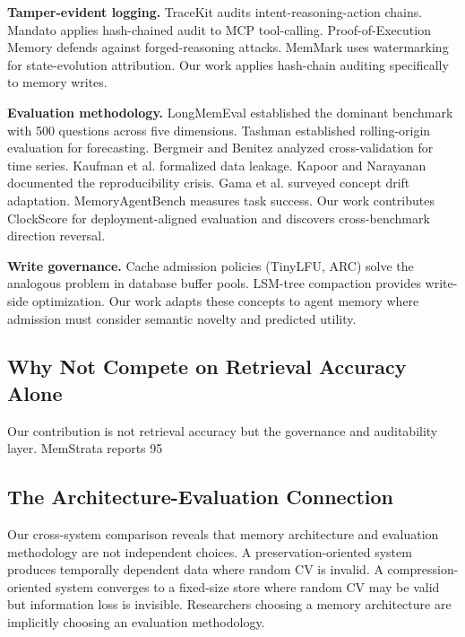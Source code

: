 \documentclass[sigconf,nonacm]{acmart}
\begin{document}
\textbf{Tamper-evident logging.} TraceKit audits intent-reasoning-action chains. Mandato applies hash-chained audit to MCP tool-calling. Proof-of-Execution Memory defends against forged-reasoning attacks. MemMark uses watermarking for state-evolution attribution. Our work applies hash-chain auditing specifically to memory writes.

\textbf{Evaluation methodology.} LongMemEval established the dominant benchmark with 500 questions across five dimensions. Tashman established rolling-origin evaluation for forecasting. Bergmeir and Benitez analyzed cross-validation for time series. Kaufman et al. formalized data leakage. Kapoor and Narayanan documented the reproducibility crisis. Gama et al. surveyed concept drift adaptation. MemoryAgentBench measures task success. Our work contributes ClockScore for deployment-aligned evaluation and discovers cross-benchmark direction reversal.

\textbf{Write governance.} Cache admission policies (TinyLFU, ARC) solve the analogous problem in database buffer pools. LSM-tree compaction provides write-side optimization. Our work adapts these concepts to agent memory where admission must consider semantic novelty and predicted utility.

\subsection{Why Not Compete on Retrieval Accuracy Alone}
Our contribution is not retrieval accuracy but the governance and auditability layer. MemStrata reports 95%

\subsection{The Architecture-Evaluation Connection}
Our cross-system comparison reveals that memory architecture and evaluation methodology are not independent choices. A preservation-oriented system produces temporally dependent data where random CV is invalid. A compression-oriented system converges to a fixed-size store where random CV may be valid but information loss is invisible. Researchers choosing a memory architecture are implicitly choosing an evaluation methodology.
\end{document}
